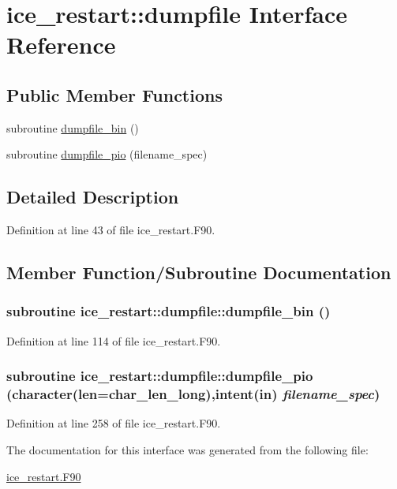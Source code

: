 \hypertarget{interfaceice__restart_1_1dumpfile}{
\section{ice\_\-restart::dumpfile Interface Reference}
\label{interfaceice__restart_1_1dumpfile}
}
\subsection*{Public Member Functions}
\begin{DoxyCompactItemize}
\item 
subroutine \hyperlink{interfaceice__restart_1_1dumpfile_a147e781f7e477624c797b10df28d10e7}{dumpfile\_\-bin} ()
\item 
subroutine \hyperlink{interfaceice__restart_1_1dumpfile_ace62f4203c593de306ee27d9c4a54cb5}{dumpfile\_\-pio} (filename\_\-spec)
\end{DoxyCompactItemize}


\subsection{Detailed Description}


Definition at line 43 of file ice\_\-restart.F90.

\subsection{Member Function/Subroutine Documentation}
\hypertarget{interfaceice__restart_1_1dumpfile_a147e781f7e477624c797b10df28d10e7}{
\subsubsection[{dumpfile\_\-bin}]{\setlength{\rightskip}{0pt plus 5cm}subroutine ice\_\-restart::dumpfile::dumpfile\_\-bin ()}}
\label{interfaceice__restart_1_1dumpfile_a147e781f7e477624c797b10df28d10e7}


Definition at line 114 of file ice\_\-restart.F90.\hypertarget{interfaceice__restart_1_1dumpfile_ace62f4203c593de306ee27d9c4a54cb5}{
\subsubsection[{dumpfile\_\-pio}]{\setlength{\rightskip}{0pt plus 5cm}subroutine ice\_\-restart::dumpfile::dumpfile\_\-pio (character(len=char\_\-len\_\-long),intent(in) {\em filename\_\-spec})}}
\label{interfaceice__restart_1_1dumpfile_ace62f4203c593de306ee27d9c4a54cb5}


Definition at line 258 of file ice\_\-restart.F90.

The documentation for this interface was generated from the following file:\begin{DoxyCompactItemize}
\item 
\hyperlink{ice__restart_8F90}{ice\_\-restart.F90}\end{DoxyCompactItemize}
